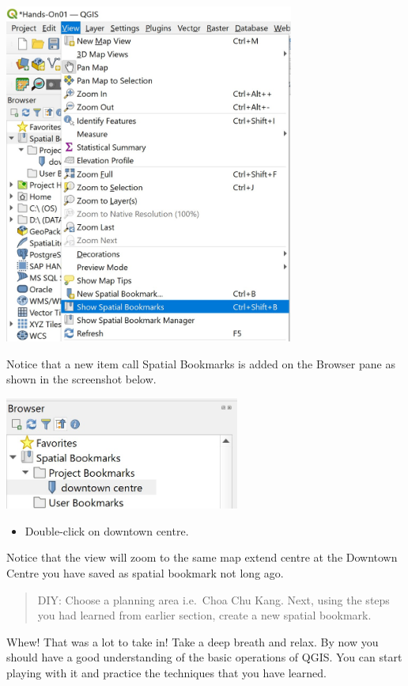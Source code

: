 \documentclass[
  letterpaper,
  DIV=11,
  numbers=noendperiod]{scrreprt}
\providecommand{\tightlist}{%
  \setlength{\itemsep}{0pt}\setlength{\parskip}{0pt}}\usepackage{longtable,booktabs,array}
\begin{document}
\includegraphics[width=3.75in,height=\textheight]{./img02/image34.jpg}

Notice that a new item call Spatial Bookmarks is added on the Browser
pane as shown in the screenshot below.

\includegraphics[width=3.04167in,height=\textheight]{./img02/image35.jpg}

\begin{itemize}
\tightlist
\item
  Double-click on downtown centre.
\end{itemize}

Notice that the view will zoom to the same map extend centre at the
Downtown Centre you have saved as spatial bookmark not long ago.

\begin{quote}
DIY: Choose a planning area i.e.~Choa Chu Kang. Next, using the steps
you had learned from earlier section, create a new spatial bookmark.
\end{quote}

Whew! That was a lot to take in! Take a deep breath and relax. By now
you should have a good understanding of the basic operations of QGIS.
You can start playing with it and practice the techniques that you have
learned.
\end{document}

